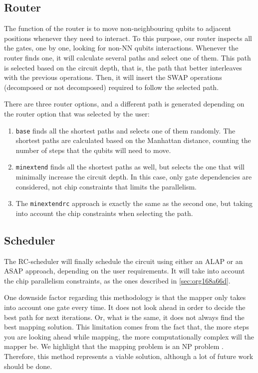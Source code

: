 \subsection{Router}
\label{sec:org18105df}
The function of the router is to move non-neighbouring qubits to adjacent positions whenever they need to interact. To this purpose, our router inspects all the gates, one by one, looking for non-NN qubits interactions.
Whenever the router finds one, it will calculate several paths and select one of them. This path is selected based on the circuit depth, that is, the path that better interleaves with the previous operations.
Then, it will insert the SWAP operations (decomposed or not decomposed) required to follow the selected path.


There are three router options, and a different path is generated depending on the router option that was selected by the user:

\begin{enumerate}
\item \texttt{base} finds all the shortest paths and selects one of them randomly. The shortest paths are calculated based on the Manhattan distance, counting the number of steps that the qubits will need to move.
\item \texttt{minextend} finds all the shortest paths as well, but selects the one that will minimally increase the circuit depth. In this case, only gate dependencies are considered, not chip constraints that limits the parallelism.
\item The \texttt{minextendrc} approach is exactly the same as the second one, but taking into account the chip constraints when selecting the path.
\end{enumerate}


\subsection{Scheduler}
\label{sec:org2ec75f3}

The RC-scheduler will finally schedule the circuit using either an ALAP or an ASAP approach, depending on the user requirements.
It will take into account the chip parallelism constraints, as the ones described in \ref{sec:org168a66d}.

One downside factor regarding this methodology is that the mapper only takes into account one gate every time.
It does not look ahead in order to decide the best path for next iterations.
Or, what is the same, it does not always find the best mapping solution.
This limitation comes from the fact that, the more steps you are looking ahead while mapping, the more computationally complex will the mapper be.
We highlight that the mapping problem is an NP problem \cite{Siraichi_2018}.
Therefore, this method represents a viable solution, although a lot of future work should be done.

